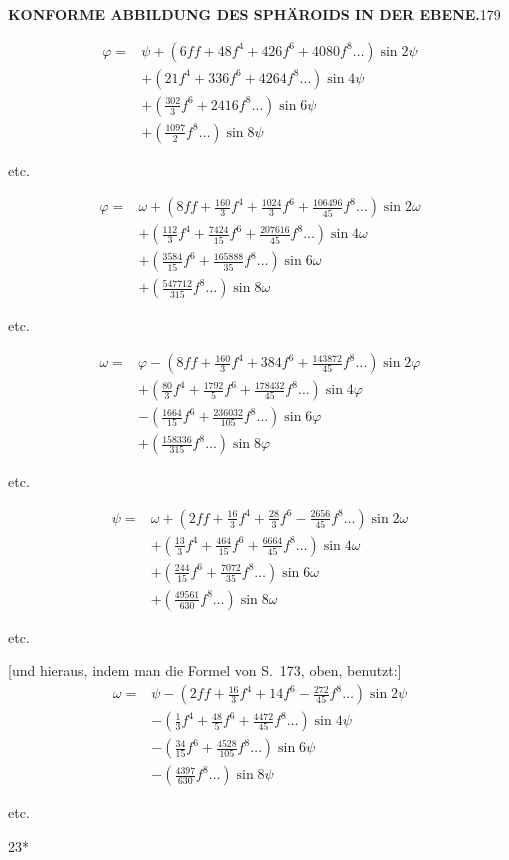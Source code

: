 \par\clearpage
\noindent\null\hfill{\small\textbf{KONFORME ABBILDUNG DES SPHÄROIDS IN DER EBENE.}}\hfill179\par\medskip
\[
\begin{aligned}
\varphi={}&\psi+(6ff+48f^4+426f^6+4080f^8\ldots)\sin2\psi\\
&+(21f^4+336f^6+4264f^8\ldots)\sin4\psi\\
&+(\tfrac{302}{3}f^6+2416f^8\ldots)\sin6\psi\\
&+(\tfrac{1097}{2}f^8\ldots)\sin8\psi
\end{aligned}
\]
{\centering etc.\par}
\[
\begin{aligned}
\varphi={}&\omega+(8ff+\tfrac{160}{3}f^4+\tfrac{1024}{3}f^6+\tfrac{106496}{45}f^8\ldots)\sin2\omega\\
&+(\tfrac{112}{3}f^4+\tfrac{7424}{15}f^6+\tfrac{207616}{45}f^8\ldots)\sin4\omega\\
&+(\tfrac{3584}{15}f^6+\tfrac{165888}{35}f^8\ldots)\sin6\omega\\
&+(\tfrac{547712}{315}f^8\ldots)\sin8\omega
\end{aligned}
\]
{\centering etc.\par}
\[
\begin{aligned}
\omega={}&\varphi-(8ff+\tfrac{160}{3}f^4+384f^6+\tfrac{143872}{45}f^8\ldots)\sin2\varphi\\
&+(\tfrac{80}{3}f^4+\tfrac{1792}{5}f^6+\tfrac{178432}{45}f^8\ldots)\sin4\varphi\\
&-(\tfrac{1664}{15}f^6+\tfrac{236032}{105}f^8\ldots)\sin6\varphi\\
&+(\tfrac{158336}{315}f^8\ldots)\sin8\varphi
\end{aligned}
\]
{\centering etc.\par}
\[
\begin{aligned}
\psi={}&\omega+(2ff+\tfrac{16}{3}f^4+\tfrac{28}{3}f^6-\tfrac{2656}{45}f^8\ldots)\sin2\omega\\
&+(\tfrac{13}{3}f^4+\tfrac{464}{15}f^6+\tfrac{6664}{45}f^8\ldots)\sin4\omega\\
&+(\tfrac{244}{15}f^6+\tfrac{7072}{35}f^8\ldots)\sin6\omega\\
&+(\tfrac{49561}{630}f^8\ldots)\sin8\omega
\end{aligned}
\]
{\centering etc.\par}
[und hieraus, indem man die Formel von S.~173, oben, benutzt:]
\[
\begin{aligned}
\omega={}&\psi-(2ff+\tfrac{16}{3}f^4+14f^6-\tfrac{272}{45}f^8\ldots)\sin2\psi\\
&-(\tfrac13f^4+\tfrac{48}{5}f^6+\tfrac{4472}{45}f^8\ldots)\sin4\psi\\
&-(\tfrac{34}{15}f^6+\tfrac{4528}{105}f^8\ldots)\sin6\psi\\
&-(\tfrac{4397}{630}f^8\ldots)\sin8\psi
\end{aligned}
\]
{\centering etc.\par}
\par\noindent\null\hfill{\small23*}\hspace*{.12\linewidth}\par

